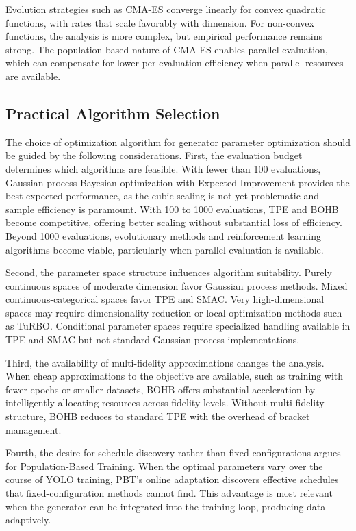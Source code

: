 Evolution strategies such as CMA-ES converge linearly for convex quadratic functions, with rates that scale favorably with dimension. For non-convex functions, the analysis is more complex, but empirical performance remains strong. The population-based nature of CMA-ES enables parallel evaluation, which can compensate for lower per-evaluation efficiency when parallel resources are available.

\subsection{Practical Algorithm Selection}
\label{subsec:practical_selection}

The choice of optimization algorithm for generator parameter optimization should be guided by the following considerations. First, the evaluation budget determines which algorithms are feasible. With fewer than 100 evaluations, Gaussian process Bayesian optimization with Expected Improvement provides the best expected performance, as the cubic scaling is not yet problematic and sample efficiency is paramount. With 100 to 1000 evaluations, TPE and BOHB become competitive, offering better scaling without substantial loss of efficiency. Beyond 1000 evaluations, evolutionary methods and reinforcement learning algorithms become viable, particularly when parallel evaluation is available.

Second, the parameter space structure influences algorithm suitability. Purely continuous spaces of moderate dimension favor Gaussian process methods. Mixed continuous-categorical spaces favor TPE and SMAC. Very high-dimensional spaces may require dimensionality reduction or local optimization methods such as TuRBO. Conditional parameter spaces require specialized handling available in TPE and SMAC but not standard Gaussian process implementations.

Third, the availability of multi-fidelity approximations changes the analysis. When cheap approximations to the objective are available, such as training with fewer epochs or smaller datasets, BOHB offers substantial acceleration by intelligently allocating resources across fidelity levels. Without multi-fidelity structure, BOHB reduces to standard TPE with the overhead of bracket management.

Fourth, the desire for schedule discovery rather than fixed configurations argues for Population-Based Training. When the optimal parameters vary over the course of YOLO training, PBT's online adaptation discovers effective schedules that fixed-configuration methods cannot find. This advantage is most relevant when the generator can be integrated into the training loop, producing data adaptively.

